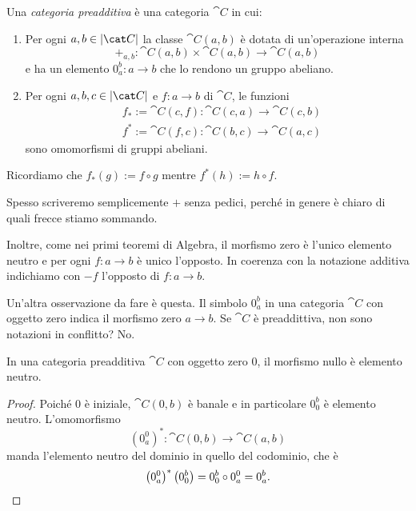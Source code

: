 \begin{definition}
  Una {\em categoria preadditiva} è una categoria \(\cat C\) in cui:
  \begin{enumerate}
  \item Per ogni \(a, b \in \obj{\cat C}\) la classe \(\cat C(a, b)\) è
    dotata di un'operazione interna
    \[
      +_{a,b} : \cat C (a, b) \times \cat C (a, b) \to \cat C (a, b)
    \]
    e ha un elemento \(0_a^b : a \to b\) che lo rendono un gruppo
    abeliano.
  \item Per ogni \(a, b, c \in \obj{\cat C}\) e \(f : a \to b\) di
    \(\cat C\), le funzioni
    \begin{align*}
      & f_\ast := \cat C(c, f) : \cat C(c, a) \to \cat C(c, b) \\
      & f^\ast := \cat C(f, c) : \cat C(b, c) \to \cat C(a, c)
    \end{align*}
    sono omomorfismi di gruppi abeliani.
  \end{enumerate}
\end{definition}

\begin{recall}
  Ricordiamo che \(f_\ast(g) := f \circ g\) mentre \(f^\ast(h) := h \circ f\).
\end{recall}

Spesso scriveremo semplicemente \(+\) senza pedici, perché in genere è
chiaro di quali frecce stiamo sommando.

Inoltre, come nei primi teoremi di Algebra, il morfismo zero è l'unico
elemento neutro e per ogni \(f : a \to b\) è unico l'opposto. In
coerenza con la notazione additiva indichiamo con \(- f\) l'opposto di
\(f : a \to b\).

Un'altra osservazione da fare è questa. Il simbolo \(0_a^b\) in una
categoria \(\cat C\) con oggetto zero indica il morfismo zero
\(a \to b\). Se \(\cat C\) è preaddittiva, non sono notazioni in
conflitto?  No.

\begin{proposition}
  In una categoria preadditiva \(\cat C\) con oggetto zero \(0\), il
  morfismo nullo è elemento neutro.
\end{proposition}

\begin{proof}
  Poiché \(0\) è iniziale, \(\cat C(0, b)\) è banale e in particolare
  \(0_0^b\) è elemento neutro. L'omomorfismo
  \[
    \left(0_a^0\right)^\ast : \cat C(0, b) \to \cat C(a, b)
  \]
  manda l'elemento neutro del dominio in quello del codominio, che è
  \[
    \left(0_a^0\right)^\ast\left(0_0^b\right) = 0_0^b \circ 0_a^0 = 0_a^b
    . \qedhere
  \]
\end{proof}

